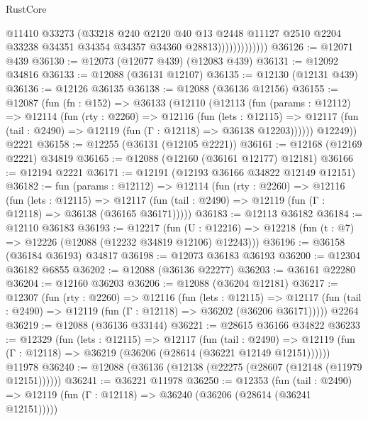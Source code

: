 \begin{lexlean}{RustCore}
\begin{coremodule}
                            @11410
                            @33273
                            (@33218
                              @240
                              @2120
                              @40
                              @13
                              @2448
                              @11127
                              @2510
                              @2204
                              @33238
                              @34351
                              @34354
                              @34357
                              @34360
                              @28813)))))))))))))
@36126 := @12071 @439
@36130 := @12073 (@12077 @439) (@12083 @439)
@36131 := @12092 @34816
@36133 := @12088 (@36131 @12107)
@36135 := @12130 (@12131 @439)
@36136 := @12126 @36135
@36138 := @12088 (@36136 @12156)
@36155 := @12087
    (fun (fn : @152) =>
    @36133
      (@12110
        (@12113
          (fun (params : @12112) =>
          @12114
            (fun (rty : @2260) =>
            @12116
              (fun (lets : @12115) =>
              @12117 (fun (tail : @2490) => @12119 (fun (Γ : @12118) => @36138 @12203))))))
        @12249))
    @2221
@36158 := @12255 (@36131 (@12105 @2221))
@36161 := @12168 (@12169 @2221) @34819
@36165 := @12088 (@12160 (@36161 @12177) @12181)
@36166 := @12194 @2221
@36171 := @12191 (@12193 @36166 @34822 @12149 @12151)
@36182 := fun (params : @12112) =>
  @12114
    (fun (rty : @2260) =>
    @12116
      (fun (lets : @12115) =>
      @12117 (fun (tail : @2490) => @12119 (fun (Γ : @12118) => @36138 (@36165 @36171)))))
@36183 := @12113 @36182
@36184 := @12110 @36183
@36193 := @12217
    (fun (U : @12216) => @12218 (fun (t : @7) => @12226 (@12088 (@12232 @34819 @12106) @12243)))
@36196 := @36158 (@36184 @36193) @34817
@36198 := @12073 @36183 @36193
@36200 := @12304 @36182 @6855
@36202 := @12088 (@36136 @22277)
@36203 := @36161 @22280
@36204 := @12160 @36203
@36206 := @12088 (@36204 @12181)
@36217 := @12307
    (fun (rty : @2260) =>
    @12116
      (fun (lets : @12115) =>
      @12117 (fun (tail : @2490) => @12119 (fun (Γ : @12118) => @36202 (@36206 @36171)))))
    @2264
@36219 := @12088 (@36136 @33144)
@36221 := @28615 @36166 @34822
@36233 := @12329
    (fun (lets : @12115) =>
    @12117
      (fun (tail : @2490) =>
      @12119 (fun (Γ : @12118) => @36219 (@36206 (@28614 (@36221 @12149 @12151))))))
    @11978
@36240 := @12088 (@36136 (@12138 (@22275 (@28607 (@12148 (@11979 @12151))))))
@36241 := @36221 @11978
@36250 := @12353
    (fun (tail : @2490) => @12119 (fun (Γ : @12118) => @36240 (@36206 (@28614 (@36241 @12151)))))

\end{coremodule}
\end{lexlean}
